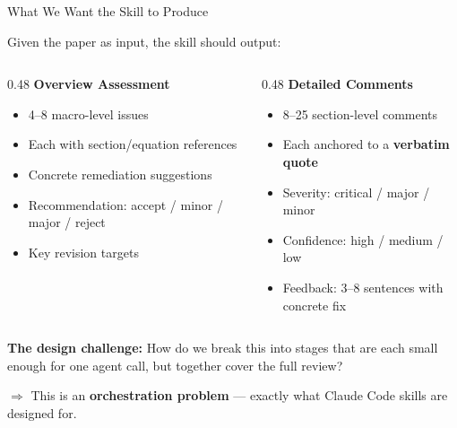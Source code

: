 \documentclass[10pt,english,aspectratio=169]{beamer}
\begin{document}
\begin{frame}{What We Want the Skill to Produce}

Given the paper as input, the skill should output:

\vspace{0.3cm}
\begin{columns}[T]
\begin{column}{0.48\textwidth}
\textbf{Overview Assessment}
\begin{itemize}
    \item 4--8 macro-level issues
    \item Each with section/equation references
    \item Concrete remediation suggestions
    \item Recommendation: accept / minor / major / reject
    \item Key revision targets
\end{itemize}
\end{column}

\begin{column}{0.48\textwidth}
\textbf{Detailed Comments}
\begin{itemize}
    \item 8--25 section-level comments
    \item Each anchored to a \textbf{verbatim quote}
    \item Severity: critical / major / minor
    \item Confidence: high / medium / low
    \item Feedback: 3--8 sentences with concrete fix
\end{itemize}
\end{column}
\end{columns}

\vspace{0.4cm}
\textbf{The design challenge:} How do we break this into stages that are each small enough for one agent call, but together cover the full review?

\vspace{0.2cm}
$\Rightarrow$ This is an \textbf{orchestration problem} --- exactly what Claude Code skills are designed for.

\end{frame}
\end{document}
